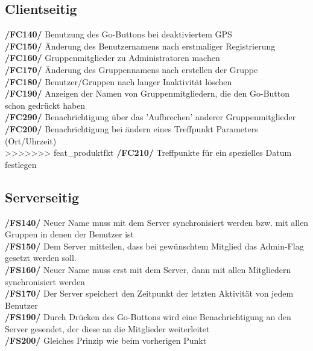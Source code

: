\subsection{Clientseitig}
     \textbf{/FC140/} Benutzung des Go-Buttons bei deaktiviertem GPS\\
     \textbf{/FC150/} Änderung des Benutzernamens nach erstmaliger Registrierung\\
     \textbf{/FC160/} Gruppenmitglieder zu Administratoren machen                \\
     \textbf{/FC170/} Änderung des Gruppennamens nach erstellen der Gruppe        \\
     \textbf{/FC180/} Benutzer/Gruppen nach langer Inaktivität löschen                     \\
     \textbf{/FC190/} Anzeigen der Namen von Gruppenmitgliedern, die den Go-Button schon gedrückt haben\\
     \textbf{/FC290/} Benachrichtigung über das 'Aufbrechen' anderer Gruppenmitglieder\\
     \textbf{/FC200/} Benachrichtigung bei ändern eines Treffpunkt Parameters (Ort/Uhrzeit)\\
>>>>>>> feat_produktfkt
     \textbf{/FC210/} Treffpunkte für ein spezielles Datum festlegen\\
\subsection{Serverseitig}
     \textbf{/FS140/} Neuer Name muss mit dem Server synchronisiert werden bzw. mit allen Gruppen in denen der Benutzer ist\\
     \textbf{/FS150/} Dem Server mitteilen, dass bei gewünschtem Mitglied das Admin-Flag gesetzt werden soll.\\
     \textbf{/FS160/} Neuer Name muss erst mit dem Server, dann mit allen Mitgliedern synchronisiert werden\\
     \textbf{/FS170/} Der Server speichert den Zeitpunkt der letzten Aktivität von jedem Benutzer\\
     \textbf{/FS190/} Durch Drücken des Go-Buttons wird eine Benachrichtigung an den Server gesendet, der diese an die Mitglieder weiterleitet\\
     \textbf{/FS200/} Gleiches Prinzip wie beim vorherigen Punkt\\
